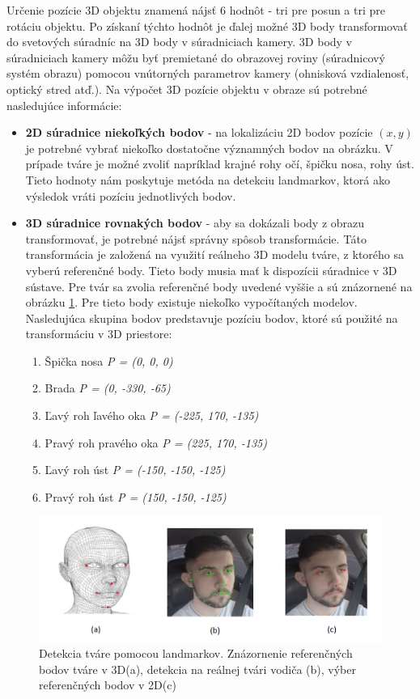 \documentclass[slovak,master,dept460,male,cpp,cpdeclaration]{diploma}
\begin{document}
Určenie pozície 3D objektu znamená nájsť 6 hodnôt  - tri pre posun a tri pre rotáciu objektu. Po získaní týchto hodnôt je ďalej možné 3D body transformovať do svetových súradníc na 3D body v súradniciach kamery. 3D body v súradniciach kamery môžu byť premietané do obrazovej roviny (súradnicový systém obrazu) pomocou vnútorných parametrov kamery (ohnisková vzdialenosť, optický stred atď.). Na výpočet 3D pozície objektu v obraze sú potrebné nasledujúce informácie:
\begin{itemize}
\item\textbf{2D súradnice niekoľkých bodov} - na lokalizáciu 2D bodov pozície  $(x, y )$ je potrebné vybrať niekoľko dostatočne významných bodov na obrázku. V prípade tváre je možné zvoliť napríklad krajné rohy očí, špičku nosa, rohy úst. Tieto hodnoty nám poskytuje metóda na detekciu landmarkov, ktorá ako výsledok vráti pozíciu jednotlivých bodov.
\item\textbf{3D súradnice rovnakých bodov}  - aby sa dokázali body z obrazu transformovať, je potrebné nájsť správny spôsob transformácie. Táto transformácia je založená na využití reálneho 3D modelu tváre, z ktorého  sa vyberú referenčné body. Tieto body musia mať k dispozícii súradnice v 3D sústave. Pre tvár sa zvolia referenčné body uvedené vyššie a sú znázornené na obrázku \ref{fig:landmarkPoints}. Pre tieto body existuje niekoľko  vypočítaných modelov. Nasledujúca skupina bodov predstavuje pozíciu bodov, ktoré sú použité  na transformáciu v 3D priestore:
\begin{enumerate}
  \item Špička nosa \textit{P = (0, 0, 0)}
  \item Brada \textit{P = (0, -330, -65)}
  \item Ľavý roh ľavého oka \textit{P = (-225, 170, -135)}
  \item Pravý roh pravého oka \textit{P = (225, 170, -135)}
  \item Ľavý roh úst \textit{P = (-150, -150, -125)}
  \item Pravý roh úst \textit{P = (150, -150, -125)}
\end{enumerate}
\end{itemize}

\begin{figure}[H]
	\centering
	\includegraphics[width=1\textwidth]{Figures/landmarkPoints.png}
	\caption{Detekcia tváre pomocou landmarkov. Znázornenie referenčných bodov tváre v 3D(a), detekcia na reálnej tvári vodiča (b), výber referenčných bodov v 2D(c)}
	\label{fig:landmarkPoints}
\end{figure}
\end{document}
